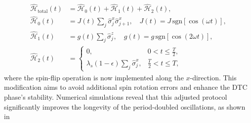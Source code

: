 \documentclass[a4paper,10pt]{article}
\begin{document}
\begin{align}
    \hat{\mathcal{H}}_{\text{total}}(t) &=  \hat{\mathcal{H}}_0(t) + \hat{\mathcal{H}}_1(t)  + \hat{\mathcal{H}}_2(t), \\
    \hat{\mathcal{H}}_0(t) &= J(t)\sum_{j} \hat{\sigma}_j^x \hat{\sigma}_{j+1}^x, \quad J(t) = J\, \mathrm{sgn}[\cos(\omega t)], \\
    \hat{\mathcal{H}}_1(t) &= g(t)\sum_{j}\hat{\sigma}_j^z, \quad g(t) = g\, \mathrm{sgn}[\cos(2 \omega t)], \\
    \hat{\mathcal{H}}_2(t) &=
    \begin{cases}
        0, & 0 < t \leq \frac{T}{2}, \\
        \lambda_s (1- \epsilon)\sum_{j}\hat{\sigma}_j^x, & \frac{T}{2} < t \leq T,
    \end{cases}
\end{align}
where the spin-flip operation is now implemented along the $x$-direction. This modification aims to avoid additional spin rotation errors and enhance the DTC phase's stability. Numerical simulations reveal that this adjusted protocol significantly improves the longevity of the period-doubled oscillations, as shown in 
\end{document}

